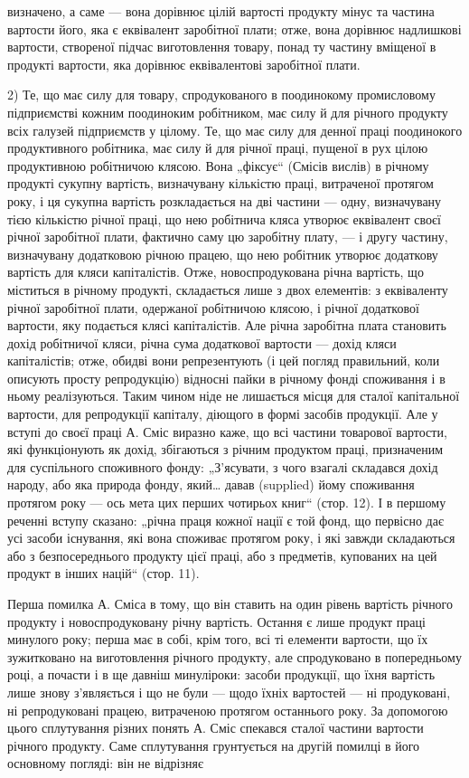 \parcont{}  %
визначено, а саме — вона дорівнює цілій вартості продукту мінус та частина вартости його, яка є
еквівалент заробітної плати; отже, вона дорівнює надлишкові вартости, створеної підчас виготовлення
товару, понад ту частину вміщеної в продукті вартости, яка дорівнює еквівалентові заробітної плати.

2) Те, що має силу для товару, спродукованого в поодинокому промисловому підприємстві кожним
поодиноким робітником, має силу й для річного продукту всіх галузей підприємств у цілому. Те, що має
силу для денної праці поодинокого продуктивного робітника, має силу й для річної праці, пущеної в
рух цілою продуктивною робітничою клясою. Вона „фіксує“ (Смісів вислів) в річному продукті сукупну
вартість, визначувану кількістю праці, витраченої протягом року, і ця сукупна вартість розкладається
на дві частини — одну, визначувану тією кількістю річної праці, що нею робітнича кляса утворює
еквівалент своєї річної заробітної плати, фактично саму цю заробітну плату, — і другу частину,
визначувану додатковою річною працею, що нею робітник утворює додаткову вартість для кляси
капіталістів. Отже, новоспродукована річна вартість, що міститься в річному продукті, складається
лише з двох елементів: з еквіваленту річної заробітної плати, одержаної робітничою клясою, і
річної додаткової вартости, яку подається клясі капіталістів. Але річна заробітна плата становить
дохід робітничої кляси, річна сума додаткової вартости — дохід кляси капіталістів; отже, обидві вони
репрезентують (і цей погляд правильний, коли описують просту репродукцію) відносні пайки в річному
фонді споживання і в ньому реалізуються. Таким чином ніде не лишається місця для сталої капітальної
вартости, для репродукції капіталу, діющого в формі засобів продукції. Але у вступі до своєї праці
А. Сміс виразно каже, що всі частини товарової вартости, які функціонують як дохід, збігаються з
річним продуктом праці, призначеним для суспільного споживного фонду: „З’ясувати, з чого взагалі
складався дохід народу, або яка природа фонду, який\dots{} давав (supplied) йому споживання протягом
року — ось мета цих перших чотирьох книг“ (стор. 12). І в першому реченні вступу сказано: „річна
праця кожної нації є той фонд, що первісно дає усі засоби існування, які вона споживає протягом
року, і які завжди складаються або з безпосереднього продукту цієї праці, або з предметів, купованих
на цей продукт в інших націй“ (стор. 11).

Перша помилка А. Сміса в тому, що він ставить на один рівень вартість річного продукту і
новоспродуковану річну вартість. Остання є лише продукт праці минулого року; перша має в собі, крім
того, всі ті елементи вартости, що їх зужитковано на виготовлення річного продукту, але спродуковано
в попередньому році, а почасти і в ще давніш минуліроки: засоби продукції, що їхня вартість лише
знову з’являється і що не були — щодо їхніх вартостей — ні продуковані, ні репродуковані працею,
витраченою протягом останнього року. За допомогою цього сплутування різних понять А. Сміс
спекався сталої частини вартости річного продукту. Саме сплутування грунтується на другій помилці в
його основному погляді: він не відрізняє
\parbreak{}  %
